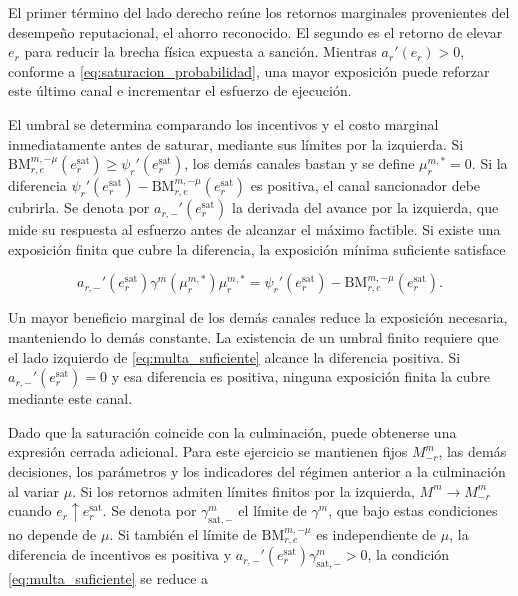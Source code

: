 El primer término del lado derecho reúne los retornos marginales provenientes del desempeño reputacional, el ahorro reconocido. El segundo es el retorno de elevar \(e_r\) para reducir la brecha física expuesta a sanción. Mientras \(a_r'(e_r)>0\), conforme a \eqref{eq:saturacion_probabilidad}, una mayor exposición puede reforzar este último canal e incrementar el esfuerzo de ejecución.

El umbral se determina comparando los incentivos y el costo marginal inmediatamente antes de saturar, mediante sus límites por la izquierda. Si \(\mathrm{BM}_{r,e}^{m,-\mu}(e_r^{\mathrm{sat}})\geq\psi_r'(e_r^{\mathrm{sat}})\), los demás canales bastan y se define \(\mu_r^{m,*}=0\). Si la diferencia \(\psi_r'(e_r^{\mathrm{sat}})-\mathrm{BM}_{r,e}^{m,-\mu}(e_r^{\mathrm{sat}})\) es positiva, el canal sancionador debe cubrirla. Se denota por \(a_{r,-}'(e_r^{\mathrm{sat}})\) la derivada del avance por la izquierda, que mide su respuesta al esfuerzo antes de alcanzar el máximo factible. Si existe una exposición finita que cubre la diferencia, la exposición mínima suficiente satisface

\begin{equation}
\label{eq:multa_suficiente}
a_{r,-}'(e_r^{\mathrm{sat}})
\gamma^m(\mu_r^{m,*})\mu_r^{m,*}
=
\psi_r'(e_r^{\mathrm{sat}})
-
\mathrm{BM}_{r,e}^{m,-\mu}(e_r^{\mathrm{sat}}).
\end{equation}

Un mayor beneficio marginal de los demás canales reduce la exposición necesaria, manteniendo lo demás constante. La existencia de un umbral finito requiere que el lado izquierdo de \eqref{eq:multa_suficiente} alcance la diferencia positiva. Si \(a_{r,-}'(e_r^{\mathrm{sat}})=0\) y esa diferencia es positiva, ninguna exposición finita la cubre mediante este canal.

Dado que la saturación coincide con la culminación, puede obtenerse una expresión cerrada adicional. Para este ejercicio se mantienen fijos \(M_{-r}^m\), las demás decisiones, los parámetros y los indicadores del régimen anterior a la culminación al variar \(\mu\). Si los retornos admiten límites finitos por la izquierda, \(M^m\to M_{-r}^m\) cuando \(e_r\uparrow e_r^{\mathrm{sat}}\). Se denota por \(\gamma_{\mathrm{sat},-}^m\) el límite de \(\gamma^m\), que bajo estas condiciones no depende de \(\mu\). Si también el límite de \(\mathrm{BM}_{r,e}^{m,-\mu}\) es independiente de \(\mu\), la diferencia de incentivos es positiva y \(a_{r,-}'(e_r^{\mathrm{sat}})\gamma_{\mathrm{sat},-}^m>0\), la condición \eqref{eq:multa_suficiente} se reduce a

